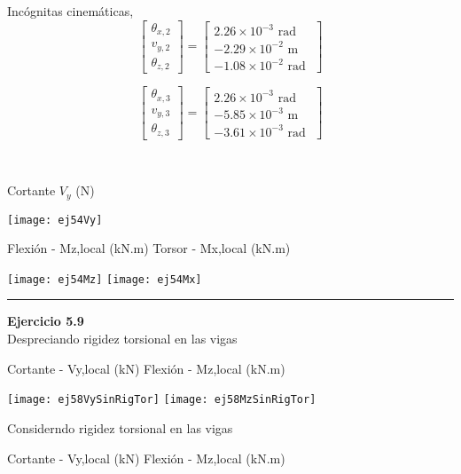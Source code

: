 \begin{minipage}{0.45\textwidth}
	Incógnitas cinemáticas,
	$$
	\left[
	\begin{matrix}
		\theta_{x,2} \\
		v_{y,2} \\
		\theta_{z,2}
	\end{matrix}
	\right]
	=
	\left[
	\begin{matrix}
		2.26\times 10^{-3} \text{ rad }\\
		-2.29\times 10^{-2} \text{ m }\\
		-1.08\times 10^{-2} \text{ rad }
	\end{matrix}
	\right]
	$$
	
	$$
	\left[
	\begin{matrix}
		\theta_{x,3} \\
		v_{y,3} \\
		\theta_{z,3}
	\end{matrix}
	\right]
	=
	\left[
	\begin{matrix}
		2.26\times 10^{-3} \text{ rad }\\
		-5.85\times 10^{-3} \text{ m }\\
		-3.61\times 10^{-3} \text{ rad }
	\end{matrix}
	\right]
	$$
\end{minipage}
~
\begin{minipage}{0.45\textwidth}
	Cortante $V_y$ (N)
	
	\texttt{[image: ej54Vy]}
\end{minipage}


Flexión - Mz,local (kN.m) \hfill  Torsor - Mx,local (kN.m)

\texttt{[image: ej54Mz]}
\texttt{[image: ej54Mx]}







\hrule
\vspace{5mm}
\textbf{Ejercicio 5.9}\\


Despreciando rigidez torsional en las vigas

\noindent
Cortante - Vy,local (kN)
\hfill
Flexión - Mz,local (kN.m)

\texttt{[image: ej58VySinRigTor]}
\texttt{[image: ej58MzSinRigTor]}


Considerndo rigidez torsional en las vigas


\noindent
Cortante - Vy,local (kN)
\hfill
Flexión - Mz,local (kN.m)


